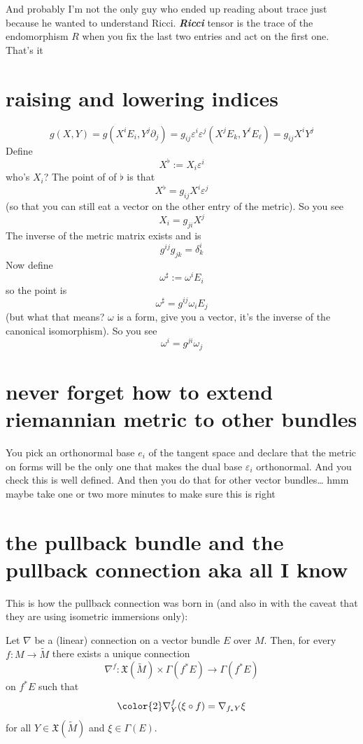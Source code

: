 And probably I'm not the only guy who ended up reading about trace just because he wanted to understand Ricci. \textit{\textbf{Ricci}} tensor is the trace of the endomorphism  \(R\) when you fix the last two entries and act on the first one. That's it

\section{raising and lowering indices}

\[g(X,Y)=g(X^iE_i,Y^j\partial_j)=g_{ij}\varepsilon^i\varepsilon^j(X^jE_k,Y^\ell E_\ell)=g_{ij}X^iY^j\]
Define
\[X^\flat:=X_i\varepsilon^i\]
who's \(X_i\)? The point of of \(\flat\) is that
\[X^\flat =g_{ij}X^i\varepsilon^j\]
(so that you can still eat a vector on the other entry of the metric). So you see
\[X_i=g_{ji}X^j\]
The inverse of the metric matrix exists and is
\[g^{ij}g_{j k}=\delta^i_k\]
Now define
\[\omega^\sharp:=\omega^iE_i\]
so the point is
\[\omega^\sharp=g^{ij}\omega_iE_j\]
(but what that means? \(\omega\) is a form, give you a vector, it's the inverse of the canonical isomorphism). So you see
\[\omega^i=g^{ji}\omega_j\]



\section{never forget how to extend riemannian metric to other bundles}

You pick an orthonormal base \(e_i\) of the tangent space and declare that the metric on forms will be the only one that makes the dual base \(\varepsilon_i\) orthonormal. And you check this is well defined. And then you do that for other vector bundles… hmm maybe take one or two more minutes to make sure this is right

\section{the pullback bundle and the pullback connection aka all I know}

This is how the pullback connection was born in \cite{au} (and also in \cite{daj} with the caveat that they are using isometric immersions only):

\begin{prop}\leavevmode
Let \(\nabla\) be a (linear) connection on a vector bundle \(E\) over \(M\). Then, for every \(f:M \to \widetilde{M}\) there exists a unique connection
\[\nabla^f:\mathfrak{X}(\widetilde{M}) \times \Gamma(f^*E) \longrightarrow \Gamma(f^*E)\]
on \(f^*E\) such that
\[{\color{2}\nabla^f_Y(\xi \circ f)=\nabla_{f_* Y}\xi}\]
for all \(Y \in \mathfrak{X}(\widetilde{M})\) and \(\xi \in \Gamma(E)\).
\end{prop}

